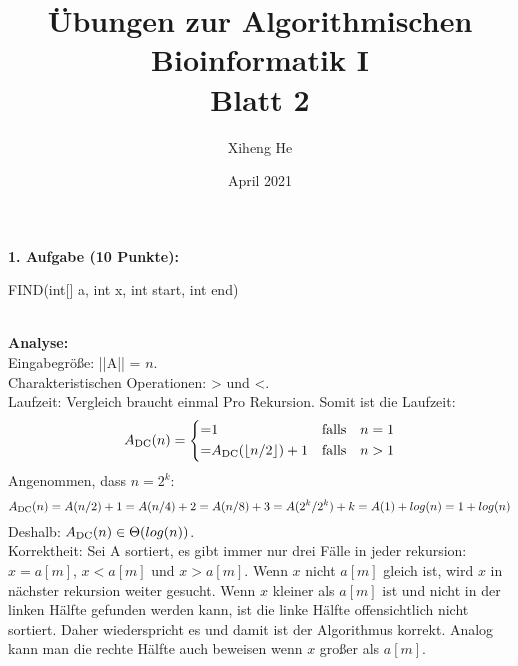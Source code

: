 \documentclass{article}
\title{Übungen zur Algorithmischen Bioinformatik I\\
Blatt 2}
\author{Xiheng He }
\date{April 2021}
\begin{document}
\maketitle
\begin{flushleft}
\textbf{1. Aufgabe (10 Punkte):}
\renewcommand\footnoterule{}
\begin{algorithm}
    \NoCaptionOfAlgo
    \caption{FIND(int[] a, int x, int start, int end)}
\end{algorithm}\\
\textbf{Analyse:} \\
Eingabegröße: ||A|| = $n$. \\
Charakteristischen Operationen: > und <. \\
Laufzeit: Vergleich braucht einmal Pro Rekursion. Somit ist die Laufzeit: 
    $$ A_{\rm DC}(n)=\left\{
    \begin{aligned}
    = & 1 &\text{falls} \quad n = 1 \\
    = & A_{\rm DC}(\lfloor n/2 \rfloor) + 1 &\text{falls} \quad n > 1\\
    \end{aligned}
    \right.
    $$
Angenommen, dass $n = 2^k$:
$$ A_{\rm DC}(n) = A(n/2) + 1 = A(n/4) + 2 = A(n/8) + 3 = A(2^k/2^k) + k = A(1) + log(n) = 1 + log(n) $$
Deshalb: $A_{\rm DC}(n) \in \Theta(log(n))$. \\
Korrektheit: Sei A sortiert, es gibt immer nur drei Fälle in jeder rekursion: $x = a[m]$, $x < a[m]$ und $x > a[m]$. 
Wenn $x$ nicht $a[m]$ gleich ist, wird $x$ in nächster rekursion weiter gesucht. Wenn $x$ kleiner als $a[m]$ ist und
nicht in der linken Hälfte gefunden werden kann, ist die linke Hälfte offensichtlich nicht sortiert. 
Daher wiederspricht es und damit ist der Algorithmus korrekt. Analog kann man die rechte Hälfte auch beweisen wenn $x$ großer als $a[m]$.
\end{flushleft}
\end{document}
